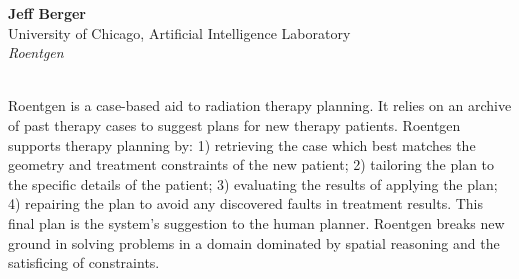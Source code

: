 \begin{center}
\end{center}
\begin{tabular}
{\bf Jeff Berger}\\
University of Chicago, Artificial Intelligence Laboratory\\
{\it Roentgen}\\
\\
\end{tabular}
Roentgen is a case-based aid to radiation therapy planning.  It relies on
an archive of past therapy cases to suggest plans for new therapy
patients. Roentgen supports therapy planning by: 1) retrieving the case
which best matches the geometry and treatment constraints of the new
patient; 2) tailoring the plan to the specific details of the patient;
3) evaluating the results of applying the plan; 4) repairing the plan
to avoid any discovered faults in treatment results. This final plan
is the system's suggestion to the human planner. Roentgen breaks new
ground in solving problems in a domain dominated by spatial reasoning
and the satisficing of constraints.


\newpage{}

